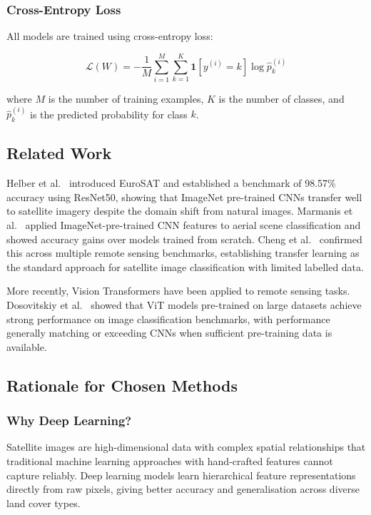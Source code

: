 \documentclass[12pt, letterpaper]{article}
\begin{document}
\subsubsection{Cross-Entropy Loss}

All models are trained using cross-entropy loss:

\begin{equation}
    \mathcal{L}(W) = -\frac{1}{M} \sum_{i=1}^{M} \sum_{k=1}^{K}
    \mathbf{1}[y^{(i)} = k] \log \hat{p}_k^{(i)}
    \label{eq:ce}
\end{equation}

where $M$ is the number of training examples, $K$ is the number of classes, and
$\hat{p}_k^{(i)}$ is the predicted probability for class $k$.

\subsection{Related Work}

Helber et al.\ \cite{helber2019eurosat} introduced EuroSAT and established a benchmark
of 98.57\% accuracy using ResNet50, showing that ImageNet pre-trained CNNs
transfer well to satellite imagery despite the domain shift from natural images.
Marmanis et al.\ \cite{marmanis2016deep} applied ImageNet-pre-trained CNN features to
aerial scene classification and showed accuracy gains over models trained
from scratch. Cheng et al.\ \cite{cheng2017remote} confirmed this across multiple remote
sensing benchmarks, establishing transfer learning as the standard approach for satellite
image classification with limited labelled data.

More recently, Vision Transformers have been applied to remote sensing tasks.
Dosovitskiy et al.\ \cite{dosovitskiy2021vit} showed that ViT models pre-trained on
large datasets achieve strong performance on image classification benchmarks, with
performance generally matching or exceeding CNNs when sufficient pre-training data is
available.

\subsection{Rationale for Chosen Methods}

\subsubsection{Why Deep Learning?}

Satellite images are high-dimensional data with complex spatial relationships that
traditional machine learning approaches with hand-crafted features cannot capture
reliably. Deep learning models learn hierarchical feature representations directly
from raw pixels, giving better accuracy and generalisation across diverse land
cover types.
\end{document}
